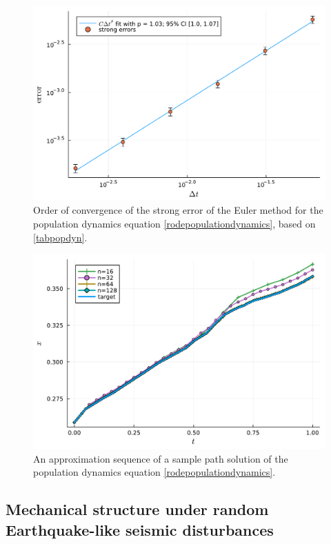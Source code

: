 \documentclass[reqno,12pt]{amsart}
\theoremstyle{plain} %
\theoremstyle{definition} %
\begin{document}
\begin{figure}[htb]
    \includegraphics[scale=0.6]{img/order_popdyn_gBmPoisson.pdf}
    \caption{Order of convergence of the strong error of the Euler method for the population dynamics equation \eqref{rodepopulationdynamics}, based on \cref{tabpopdyn}.}
    \label{figpopdyn}
\end{figure}

\begin{figure}[htb]
    \includegraphics[scale=0.6]{img/sample_popdyn_gBmPoisson.pdf}
    \caption{An approximation sequence of a sample path solution of the population dynamics equation \eqref{rodepopulationdynamics}.}
    \label{figsamplepopdyn}
\end{figure}

\subsection{Mechanical structure under random Earthquake-like seismic disturbances}
\end{document}
